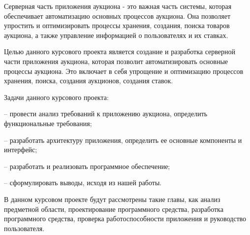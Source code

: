 \label{course:introduction}

Серверная часть приложения аукциона - это важная часть системы, 
которая обеспечивает автоматизацию основных процессов аукциона. 
Она позволяет упростить и оптимизировать процессы хранения, создания,
поиска товаров аукциона, а также управление информацией о пользователях и их ставках. 

Целью данного курсового проекта является создание и разработка серверной части приложения аукциона, 
которая позволит автоматизировать основные процессы аукциона. 
Это включает в себя упрощение и оптимизацию процессов хранения, поиска, создания аукционов, создания ставок. 

Задачи данного курсового проекта:

– провести анализ требований к приложению аукциона, определить функциональные требования;
   
– разработать архитектуру приложения, определить ее основные компоненты и интерфейс;

– разработать и реализовать программное обеспечение;

– сформулировать выводы, исходя из нашей работы.

В данном курсовом проекте будут рассмотрены такие главы, 
как анализ предметной области, 
проектирование программного средства, 
разработка программного средства, 
проверка работоспособности приложения и руководство пользователя.